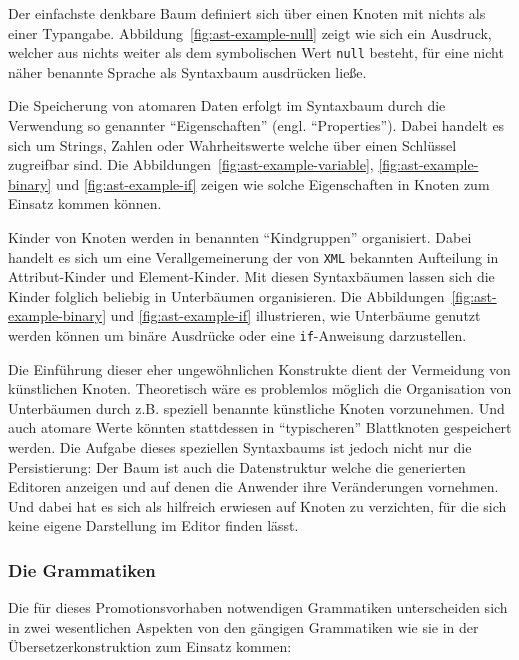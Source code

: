 \documentclass[paper=a4,fontsize=12pt,parskip=half]{scrartcl}
\begin{document}
Der einfachste denkbare Baum definiert sich über einen Knoten mit nichts als einer Typangabe. Abbildung~\ref{fig:ast-example-null} zeigt wie sich ein Ausdruck, welcher aus nichts weiter als dem symbolischen Wert \texttt{null} besteht, für eine nicht näher benannte Sprache als Syntaxbaum ausdrücken ließe.

Die Speicherung von atomaren Daten erfolgt im Syntaxbaum durch die Verwendung so genannter \enquote{Eigenschaften} (engl. \enquote{Properties}). Dabei handelt es sich um Strings, Zahlen oder Wahrheitswerte welche über einen Schlüssel zugreifbar sind. Die Abbildungen~\ref{fig:ast-example-variable}, \ref{fig:ast-example-binary} und \ref{fig:ast-example-if} zeigen wie solche Eigenschaften in Knoten zum Einsatz kommen können.

Kinder von Knoten werden in benannten \enquote{Kindgruppen} organisiert. Dabei handelt es sich um eine Verallgemeinerung der von \texttt{XML} bekannten Aufteilung in Attribut-Kinder und Element-Kinder. Mit diesen Syntaxbäumen lassen sich die Kinder folglich beliebig in Unterbäumen organisieren. Die Abbildungen~\ref{fig:ast-example-binary} und \ref{fig:ast-example-if} illustrieren, wie Unterbäume genutzt werden können um binäre Ausdrücke oder eine \texttt{if}-Anweisung darzustellen.

Die Einführung dieser eher ungewöhnlichen Konstrukte dient der Vermeidung von künstlichen Knoten. Theoretisch wäre es problemlos möglich die Organisation von Unterbäumen durch z.B. speziell benannte künstliche Knoten vorzunehmen. Und auch atomare Werte könnten stattdessen in \enquote{typischeren} Blattknoten gespeichert werden. Die Aufgabe dieses speziellen Syntaxbaums ist jedoch nicht nur die Persistierung: Der Baum ist auch die Datenstruktur welche die generierten Editoren anzeigen und auf denen die Anwender ihre Veränderungen vornehmen. Und dabei hat es sich als hilfreich erwiesen auf Knoten zu verzichten, für die sich keine eigene Darstellung im Editor finden lässt.

\subsubsection{Die Grammatiken}

Die für dieses Promotionsvorhaben notwendigen Grammatiken unterscheiden sich in zwei wesentlichen Aspekten von den gängigen Grammatiken wie sie in der Übersetzerkonstruktion zum Einsatz kommen:
\end{document}
